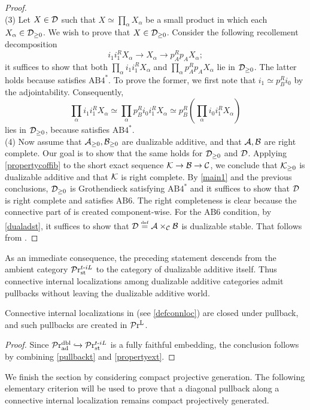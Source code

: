 \documentclass[a4paper,10pt, oneside]{amsart}
\begin{document}
\begin{proof}
\\
(3)
Let $X\in \mathcal{D}$ such that $X\simeq\prod_\alpha X_\alpha$ be a small product in which each $X_\alpha \in \mathcal{D}_{\geq0}$. We wish to prove that $X\in \mathcal{D}_{\geq0}$. Consider the following recollement decomposition
$$i_1i_1^R X_\alpha\to X_\alpha\to p_A^R p_A X_\alpha;$$
it suffices to show that both $\prod_\alpha i_1i_1^R X_\alpha$ and $\prod_\alpha p_A^R p_A X_\alpha$ lie in $\mathcal{D}_{\geq0}$. The latter holds because \mca satisfies $\mathrm{AB4}^*$. To prove the former, we first note that $i_1\simeq p_B^R i_0$ by the adjointability. Consequently, $$\prod_\alpha i_1i_1^R X_\alpha\simeq\prod_\alpha p_B^Ri_0 i_1^R X_\alpha \simeq  p_B^R(\prod_\alpha i_0i_1^R X_\alpha)$$ lies in $\mathcal{D}_{\geq0}$, because \mcb satisfies $\mathrm{AB4}^*$.
\\
(4) Now assume that $\mathcal{A}_{\geq 0}, \mathcal{B}_{\geq 0}$ are dualizable additive, and that $\mathcal{A}, \mathcal{B}$ are right 
complete. Our goal is to show that the same holds for $\mathcal{D}_{\geq 0}$ and $\mathcal{D}$. Applying \cref{propertycoffib} to 
the short exact sequence $\mathcal{K}\to\mathcal{B}\to\mathcal{C}$, we conclude that $\mathcal{K}_{\geq0}$ is dualizable additive and that 
$\mathcal{K}$ is right complete. By \cref{main1} and the previous conclusions, $\mathcal{D}_{\geq 0}$ is Grothendieck satisfying 
$\mathrm{AB4}^*$ and it suffices to show that $\mathcal{D}$ is right complete and satisfies $\mathrm{AB6}$. The 
right completeness is clear because the connective part of \mcd is created component-wise. For the $\mathrm{AB6}$ 
condition, by \cref{dualadst}, it suffices to show that $\mathcal{D} \overset{\underset{\mathrm{def}}{}}{=}\mathcal{A}\times_{\mathcal{C}}\mathcal{B}$ is dualizable stable. That follows from \cite[Proposition 1.87(2)]{efimov2024k}.
	\end{proof}
	As an immediate consequence, the preceding statement descends from the ambient category $\mathcal{P}\mathrm{r}^{t\text{-}iL}_{\mathrm{st}}$ to the category of dualizable additive \infcats itself. Thus connective internal localizations among dualizable additive categories admit pullbacks without leaving the dualizable additive world.
	\begin{cor}\label{connpullbackofdualadd}
	 Connective internal localizations in \praddbl (see \cref{defconnloc}) are closed under pullback, and such pullbacks are created in $\mathcal{P}\mathrm{r}^\mathrm{L}$.
	\end{cor}
	\begin{proof}
		Since $\mathcal{P}\mathrm{r}_{\mathrm{ad}}^{\mathrm{dbl}}\xhookrightarrow{}\mathcal{P}\mathrm{r}^{t\text{-}iL}_{\mathrm{st}}$ is a fully faithful embedding, the conclusion follows by combining \cref{pullbackt} and \cref{propertyext}.
	\end{proof}
	We finish the section by considering  compact projective generation. The following elementary criterion will be used to prove that a diagonal pullback along a connective internal localization remains compact projectively generated.
	
\end{document}
